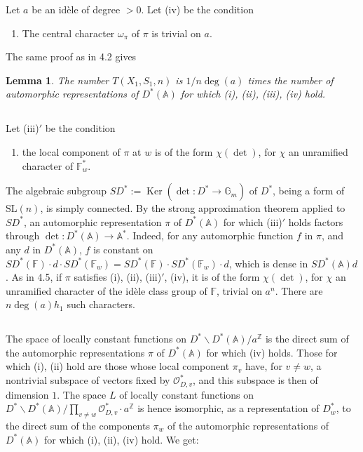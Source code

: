 \documentclass[11pt,a4paper]{article}
\theoremstyle{plain}
\newtheorem{lemma}[theorem]{Lemma}
\theoremstyle{definition}
\DeclareMathOperator{\Ker}{Ker}
\newcommand{\Z}{\mathbb{Z}}
\newcommand{\Gm}{\mathbb{G}_m}
\newcommand{\SL}{\mathrm{SL}}
\begin{document}
Let $a$ be an id\`ele of degree $>0$. Let (iv) be the condition
\begin{enumerate}
\item[(iv)] The central character $\omega_\pi$ of $\pi$ is trivial on $a$.
\end{enumerate}

The same proof as in 4.2 gives

\begin{lemma}
The number $T(X_1,S_1,n)$ is $1/n\deg(a)$ times the number of automorphic representations of $D^*(\mathbb{A})$ for which (i), (ii), (iii), (iv) hold.
\end{lemma}

\subsection{}
Let (iii)$'$ be the condition
\begin{enumerate}
\item[(iii)$'$] the local component of $\pi$ at $w$ is of the form $\chi(\det)$, for $\chi$ an unramified character of $\mathbb{F}_w^*$.
\end{enumerate}
The algebraic subgroup $SD^* := \Ker(\det: D^* \to \Gm)$ of $D^*$, being a form of $\SL(n)$, is simply connected. By the strong approximation theorem applied to $SD^*$, an automorphic representation $\pi$ of $D^*(\mathbb{A})$ for which (iii)$'$ holds factors through $\det: D^*(\mathbb{A}) \to \mathbb{A}^*$. Indeed, for any automorphic function $f$ in $\pi$, and any $d$ in $D^*(\mathbb{A})$, $f$ is constant on $SD^*(\mathbb{F}) \cdot d \cdot SD^*(\mathbb{F}_w) = SD^*(\mathbb{F}) \cdot SD^*(\mathbb{F}_w) \cdot d$, which is dense in $SD^*(\mathbb{A})d$. As in 4.5, if $\pi$ satisfies (i), (ii), (iii)$'$, (iv), it is of the form $\chi(\det)$, for $\chi$ an unramified character of the id\`ele class group of $\mathbb{F}$, trivial on $a^{n}$. There are $n\deg(a) h_1$ such characters.

\subsection{}
The space of locally constant functions on $D^* \backslash D^*(\mathbb{A}) / a^{\Z}$ is the direct sum of the automorphic representations $\pi$ of $D^*(\mathbb{A})$ for which (iv) holds. Those for which (i), (ii) hold are those whose local component $\pi_v$ have, for $v \neq w$, a nontrivial subspace of vectors fixed by $\mathcal{O}_{D,v}^*$, and this subspace is then of dimension $1$. The space $L$ of locally constant functions on $D^* \backslash D^*(\mathbb{A}) / \prod_{v \neq w} \mathcal{O}_{D,v}^* \cdot a^{\Z}$ is hence isomorphic, as a representation of $D_w^*$, to the direct sum of the components $\pi_w$ of the automorphic representations of $D^*(\mathbb{A})$ for which (i), (ii), (iv) hold. We get:
\end{document}
